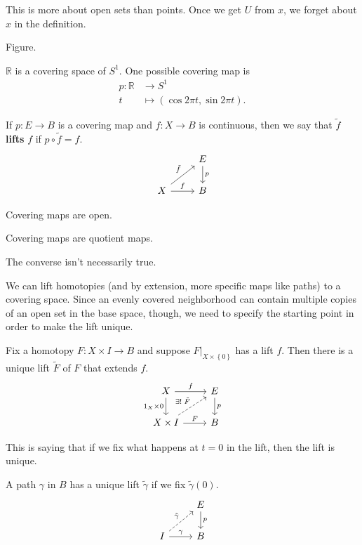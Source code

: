 \documentclass[twoside,10pt]{report}
\begin{document}
This is more about open sets than points. Once we get $U$ from $x$, we forget about $x$ in the definition.

{\color{red}Figure.}

\begin{ex}[]
	$\mathbb{R}$ is a covering space of $S^{1}$. One possible covering map is
		\begin{align*}
			p:\mathbb{R}&\to S^{1}\\
			t&\mapsto (\cos 2\pi t,\sin 2\pi t).
		\end{align*}
\end{ex}

\begin{defn}[]
If $p:E\to B$ is a covering map and $f:X\to B$ is continuous, then we say that $\tilde{f}$ \textbf{lifts} $f$ if $p \circ \tilde{f}=f$.
\[
\begin{tikzcd}
	&E\dar{p}\\
	X\rar{f}\arrow[ur,"\tilde{f}"]&B
\end{tikzcd}
\] 
\end{defn}

\begin{prop}
Covering maps are open.
\end{prop}

\begin{cor}
Covering maps are quotient maps.
\end{cor}
{\color{red}The converse isn't necessarily true.}

We can lift homotopies (and by extension, more specific maps like paths) to a covering space. Since an evenly covered neighborhood can contain multiple copies of an open set in the base space, though, we need to specify the starting point in order to make the lift unique.

\begin{thrm}
	Fix a homotopy $F:X \times I\to B$ and suppose $F|_{X \times \left\{ 0 \right\}}$ has a lift $f$. Then there is a unique lift $\tilde{F}$ of $F$ that extends $f$.
\[
\begin{tikzcd}
	X\rar{f}\arrow[d,"1_{X}\times 0"']&E\dar{p}\\
	X\times I\rar{F}\arrow[ur,dashed,"\exists ! \; \tilde{F}"]&B
\end{tikzcd}
\] 
\end{thrm}
This is saying that if we fix what happens at $t=0$ in the lift, then the lift is unique.

\begin{cor}
	A path $\gamma$ in $B$ has a unique lift $\tilde{\gamma}$ if we fix $\tilde{\gamma}(0)$.
	\[
	\begin{tikzcd}
		&E\dar{p}\\
		I\arrow[ur,dashed,"\tilde{\gamma}"]\rar{\gamma}&B
	\end{tikzcd}
	\] 
\end{cor}
\end{document}
